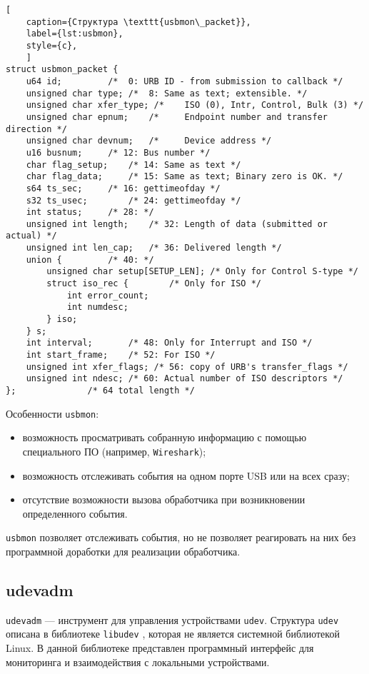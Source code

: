 \begin{lstlisting}[
	caption={Структура \texttt{usbmon\_packet}},
	label={lst:usbmon},
	style={c},
	]
struct usbmon_packet {
	u64 id;			/*  0: URB ID - from submission to callback */
	unsigned char type;	/*  8: Same as text; extensible. */
	unsigned char xfer_type; /*    ISO (0), Intr, Control, Bulk (3) */
	unsigned char epnum;	/*     Endpoint number and transfer direction */
	unsigned char devnum;	/*     Device address */
	u16 busnum;		/* 12: Bus number */
	char flag_setup;	/* 14: Same as text */
	char flag_data;		/* 15: Same as text; Binary zero is OK. */
	s64 ts_sec;		/* 16: gettimeofday */
	s32 ts_usec;		/* 24: gettimeofday */
	int status;		/* 28: */
	unsigned int length;	/* 32: Length of data (submitted or actual) */
	unsigned int len_cap;	/* 36: Delivered length */
	union {			/* 40: */
		unsigned char setup[SETUP_LEN];	/* Only for Control S-type */
		struct iso_rec {		/* Only for ISO */
			int error_count;
			int numdesc;
		} iso;
	} s;
	int interval;		/* 48: Only for Interrupt and ISO */
	int start_frame;	/* 52: For ISO */
	unsigned int xfer_flags; /* 56: copy of URB's transfer_flags */
	unsigned int ndesc;	/* 60: Actual number of ISO descriptors */
};				/* 64 total length */
\end{lstlisting}

Особенности \texttt{usbmon}:

\begin{itemize}
	\item возможность просматривать собранную информацию с помощью специального ПО (например, \texttt{Wireshark});
	\item возможность отслеживать события на одном порте USB или на всех сразу;
	\item отсутствие возможности вызова обработчика при возникновении определенного события.
\end{itemize}

\texttt{usbmon} позволяет отслеживать события, но не позволяет реагировать на них без программной доработки для реализации обработчика.

\subsection{udevadm}

\texttt{udevadm} \cite{udevadm} --- инструмент для управления устройствами \texttt{udev}. Структура \texttt{udev} описана в библиотеке \texttt{libudev} \cite{libudev}, которая не является системной библиотекой Linux. В данной библиотеке представлен программный интерфейс для мониторинга и взаимодействия с локальными устройствами.

